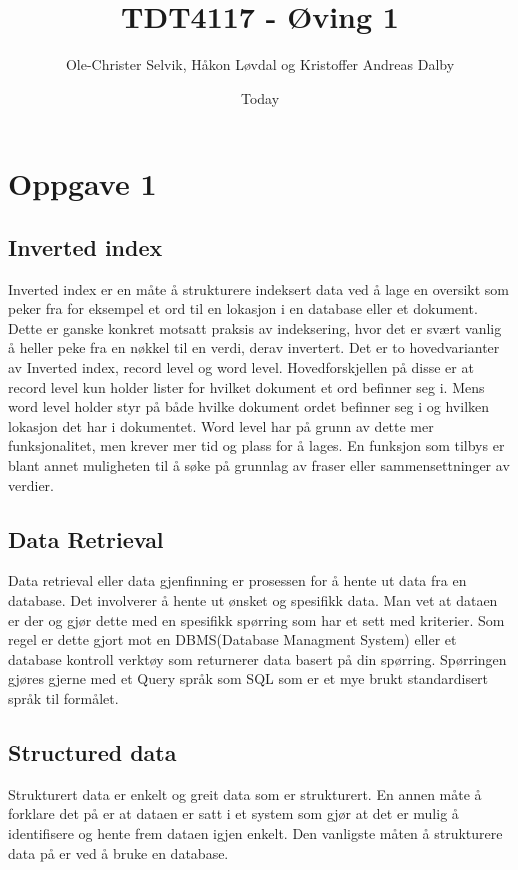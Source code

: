 \documentclass[]{article}
\begin{document}
\title{TDT4117 - Øving 1}
\author{Ole-Christer Selvik, Håkon Løvdal og Kristoffer Andreas Dalby}
\date{Today}
\maketitle

\section{Oppgave 1}
\subsection{Inverted index}
Inverted index er en måte å strukturere indeksert data ved å lage en oversikt som peker fra for eksempel et ord til en lokasjon i en database eller et dokument. Dette er ganske konkret motsatt praksis av indeksering, hvor det er svært vanlig å heller peke fra en nøkkel til en verdi, derav invertert.
Det er to hovedvarianter av Inverted index, record level og word level. Hovedforskjellen på disse er at record level kun holder lister for hvilket dokument et ord befinner seg i. Mens word level holder styr på både hvilke dokument ordet befinner seg i og hvilken lokasjon det har i dokumentet. Word level har på grunn av dette mer funksjonalitet, men krever mer tid og plass for å lages. En funksjon som tilbys er blant annet muligheten til å søke på grunnlag av fraser eller sammensettninger av verdier.

\subsection{Data Retrieval}
Data retrieval eller data gjenfinning er prosessen for å hente ut data fra en database. Det involverer å hente ut ønsket og spesifikk data. Man vet at dataen er der og gjør dette med en spesifikk spørring som har et sett med kriterier. Som regel er dette gjort mot en DBMS(Database Managment System) eller et database kontroll verktøy som returnerer data basert på din spørring. Spørringen gjøres gjerne med et Query språk som SQL som er et mye brukt standardisert språk til formålet.

\subsection{Structured data}
Strukturert data er enkelt og greit data som er strukturert. En annen måte å forklare det på er at dataen er satt i et system som gjør at det er mulig å identifisere og hente frem dataen igjen enkelt. Den vanligste måten å strukturere data på er ved å bruke en database.  
\end{document}
